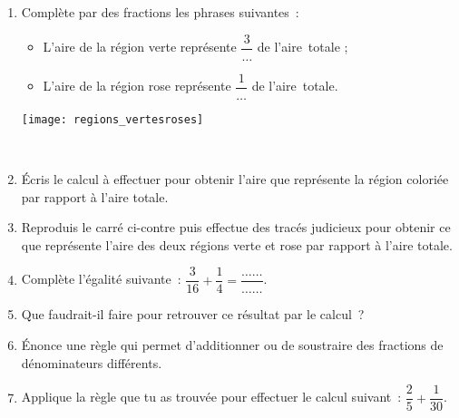 
\begin{activite}

\begin{enumerate}
 \item Complète par des fractions les phrases suivantes :
 
 \begin{minipage}[c]{0.68\linewidth}
 \begin{itemize}
  \item L'aire de la région verte représente $\dfrac{3}{\ldots}$ de l'aire totale ;
  \vspace{0.3cm}
  \item L'aire de la région rose représente $\dfrac{1}{\ldots}$ de l'aire totale.
  \end{itemize}
  \end{minipage} \hfill%
  \begin{minipage}[c]{0.28\linewidth}
  \texttt{[image: regions\_vertesroses]}
   \end{minipage} \\
 \item Écris le calcul à effectuer pour obtenir l'aire que représente la région coloriée par rapport à l'aire totale.
 \item Reproduis le carré ci-contre puis effectue des tracés judicieux pour obtenir ce que représente l'aire des deux régions verte et rose par rapport à l'aire totale. 
 \item Complète l'égalité suivante : $\dfrac{3}{16} + \dfrac{1}{4} = \dfrac{\ldots \ldots}{\ldots \ldots}$.
 \vspace{0.2cm}
 \item Que faudrait-il faire pour retrouver ce résultat par le calcul ?
 \item Énonce une règle qui permet d'additionner ou de soustraire des fractions de dénominateurs différents. 
 \item Applique la règle que tu as trouvée pour effectuer le calcul suivant : $\dfrac{2}{5} + \dfrac{1}{30}$.
\end{enumerate}

\end{activite}

